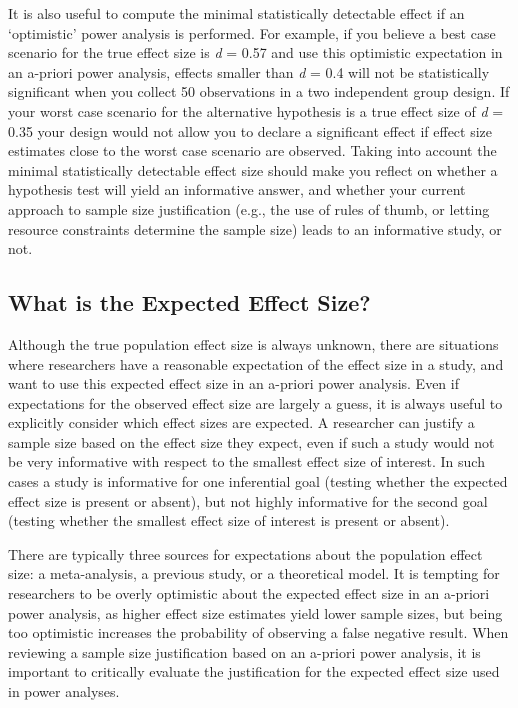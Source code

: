 \documentclass[
  english,
  ,jou,floatsintext]{apa6}
\begin{document}
It is also useful to compute the minimal statistically detectable effect if an `optimistic' power analysis is performed. For example, if you believe a best case scenario for the true effect size is \emph{d} = 0.57 and use this optimistic expectation in an a-priori power analysis, effects smaller than \emph{d} = 0.4 will not be statistically significant when you collect 50 observations in a two independent group design. If your worst case scenario for the alternative hypothesis is a true effect size of \emph{d} = 0.35 your design would not allow you to declare a significant effect if effect size estimates close to the worst case scenario are observed. Taking into account the minimal statistically detectable effect size should make you reflect on whether a hypothesis test will yield an informative answer, and whether your current approach to sample size justification (e.g., the use of rules of thumb, or letting resource constraints determine the sample size) leads to an informative study, or not.

\hypertarget{what-is-the-expected-effect-size}{%
\subsection{What is the Expected Effect Size?}\label{what-is-the-expected-effect-size}}

Although the true population effect size is always unknown, there are situations where researchers have a reasonable expectation of the effect size in a study, and want to use this expected effect size in an a-priori power analysis. Even if expectations for the observed effect size are largely a guess, it is always useful to explicitly consider which effect sizes are expected. A researcher can justify a sample size based on the effect size they expect, even if such a study would not be very informative with respect to the smallest effect size of interest. In such cases a study is informative for one inferential goal (testing whether the expected effect size is present or absent), but not highly informative for the second goal (testing whether the smallest effect size of interest is present or absent).

There are typically three sources for expectations about the population effect size: a meta-analysis, a previous study, or a theoretical model. It is tempting for researchers to be overly optimistic about the expected effect size in an a-priori power analysis, as higher effect size estimates yield lower sample sizes, but being too optimistic increases the probability of observing a false negative result. When reviewing a sample size justification based on an a-priori power analysis, it is important to critically evaluate the justification for the expected effect size used in power analyses.
\end{document}
